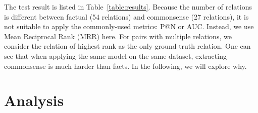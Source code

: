\documentclass[11pt,a4paper]{article}
\newcommand{\KZ}[1]{\textcolor{blue}{Kenny: #1}}
\begin{document}
The test result is listed in Table~\ref{table:results}. 
Because the number of relations is different between factual (54 relations) 
and commonsense (27 relations), it is not suitable to apply the commonly-used metrics: 
P@N or AUC. Instead, we use Mean Reciprocal Rank (MRR) here. 
For pairs with multiple relations, we consider the relation of highest rank 
as the only ground truth relation.
One can see that when applying the same model on the same dataset, extracting
commonsense is much harder than facts. In the following, we will explore
why.




	
\section{Analysis}
\label{sec:analysis}
\end{document}
